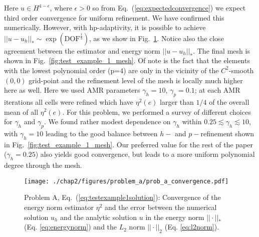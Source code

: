 Here $u \in H^{4-\epsilon}$, where $\epsilon > 0$ so from
Eq.~(\ref{eq:expectedconvergence}) we expect third order convergence
for uniform refinement. We have confirmed this numerically. However,
with hp-adaptivity, it is possible to achieve $||u-u_{h}||_{*} \sim
\exp(\text{DOF}^{\frac{1}{3}})$, as we show in
Fig.~\ref{fig:test_example_1_u_convergence}. Notice also the close
agreement between the estimator and energy norm $||u-u_{h}||_*$. The final mesh is shown in Fig.~\ref{fig:test_example_1_mesh}. Of
note is the fact that the elements with the lowest polynomial order
(p=4) are only in the vicinity of the $C^{2}$-smooth $(0,0)$
grid-point and the refinement level of the mesh is locally much higher
here as well. Here we
used AMR parameters $\gamma_h = 10$, $\gamma_p = 0.1$; at each AMR
iterations all cells were refined which have $\eta^2(e)$ larger than
$1/4$ of the overall mean of all $\eta^2(e)$. For this
problem, we performed a survey of different choices for $\gamma_h$
and $\gamma_p$.  We found rather modest dependence on $\gamma_h$
within $0.25\lesssim \gamma_h\lesssim 10$, with $\gamma_h\!=\!10$ leading to the good balance between
$h-$ and $p-$refinement shown in Fig.~\ref{fig:test_example_1_mesh}.
Our preferred value for the rest of the paper ($\gamma_h=0.25$) also
yields good convergence, but leads to a more uniform polynomial
degree through the mesh.


\begin{figure}
  \centering
  \texttt{[image: ./chap2/figures/problem\_a/prob\_a\_convergence.pdf]}
  \caption{Problem A, Eq.~(\ref{eq:testexample1solution}): Convergence of the energy norm estimator $\eta^2$ and the error between the numerical solution $u_h$ and the analytic solution $u$ in the energy norm $||\cdot||_*$ (Eq. \ref{eq:energynorm}) and the $L_2$ norm $||\cdot||_2$ (Eq. \ref{eq:l2norm}).}
  \label{fig:test_example_1_u_convergence} 
\end{figure}

